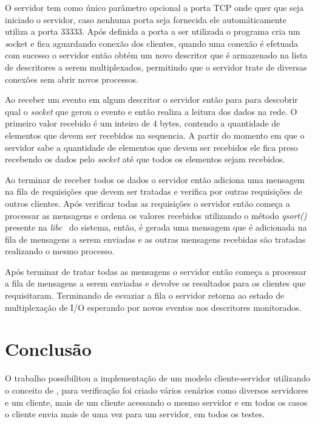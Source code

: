 \documentclass[portuguese, conference]{IEEEtran}
\begin{document}
O servidor tem como único parâmetro opcional a porta TCP onde quer que seja iniciado o servidor, caso nenhuma porta seja fornecida ele automáticamente utiliza a porta 33333. Após definida a porta a ser utilizada o programa cria um {\textit socket} e fica aguardando conexão dos clientes, quando uma conexão é efetuada com sucesso o servidor então obtém um novo descritor que é armazenado na lista de descritores a serem multiplexados, permitindo que o servidor trate de diversas conexões sem abrir novos processos.

Ao receber um evento em algum descritor o servidor então para para descobrir qual o \textit{socket} que gerou o evento e então realiza a leitura dos dados na rede. O primeiro valor recebido é um inteiro de 4 bytes, contendo a quantidade de elementos que devem ser recebidos na sequencia. A partir do momento em que o servidor sabe a quantidade de elementos que devem ser recebidos ele fica preso recebendo os dados pelo \textit{socket} até que todos os elementos sejam recebidos.

Ao terminar de receber todos os dados o servidor então adiciona uma mensagem na fila de requisições que devem ser tratadas e verifica por outras requisições de outros clientes. Após verificar todas as requisições o servidor então começa a processar as mensagens e ordena os valores recebidos utilizando o método \textit{qsort()} presente na \textit{libc}~\cite{LIN15} do sistema, então, é gerada uma mensagem que é adicionada na fila de mensagens a serem enviadas e as outras mensagens recebidas são tratadas realizando o mesmo processo.

Após terminar de tratar todas as mensagens o servidor então começa a processar a fila de mensagens a serem enviadas e devolve os resultados para os clientes que requisitaram. Terminando de esvaziar a fila o servidor retorna ao estado de multiplexação de I/O esperando por novos eventos nos descritores monitorados.

\section{Conclusão}

O trabalho possibilitou a implementação de um modelo cliente-servidor utilizando o conceito de , para verificação foi criado vários cenários como diversos servidores e um cliente, mais de um cliente acessando o mesmo servidor e em todos os casos o cliente envia mais de uma vez para um servidor, em todos os testes.



\end{document}
